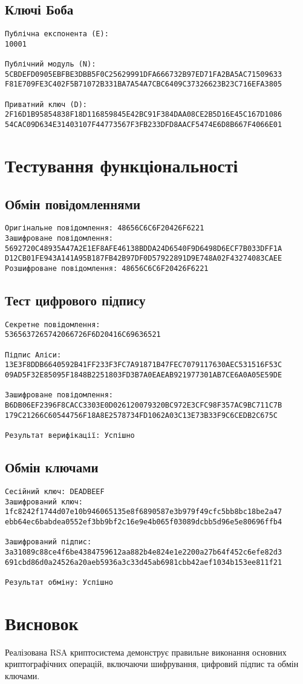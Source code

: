 \documentclass[12pt]{article}
\begin{document}
\subsection{Ключі Боба}
\begin{verbatim}
Публічна експонента (E):
10001

Публічний модуль (N):
5CBDEFD0905EBFBE3DBB5F0C25629991DFA666732B97ED71FA2BA5AC71509633
F81E709FE3C402F5B71072B331BA7A54A7CBC6409C37326623B23C716EFA3805

Приватний ключ (D):
2F16D1B95854838F18D116859845E42BC91F384DAA08CE2B5D16E45C167D1086
54CAC09D634E31403107F44773567F3FB233DFD8AACF5474E6D8B667F4066E01
\end{verbatim}

\section{Тестування функціональності}

\subsection{Обмін повідомленнями}
\begin{verbatim}
Оригінальне повідомлення: 48656C6C6F20426F6221
Зашифроване повідомлення: 
5692720C48935A47A2E1EF8AFE46138BDDA24D6540F9D6498D6ECF7B033DFF1A
D12CB01FE943A141A95B187FB42B97DF0D57922891D9E748A02F43274083CAEE
Розшифроване повідомлення: 48656C6C6F20426F6221
\end{verbatim}

\subsection{Тест цифрового підпису}
\begin{verbatim}
Секретне повідомлення: 
5365637265742066726F6D20416C69636521

Підпис Аліси:
13E3F8DDB6640592B41FF233F3FC7A91871B47FEC7079117630AEC531516F53C
09AD5F32E85095F1848B2251803FD3B7A0EAEAB921977301AB7CE6A0A05E59DE

Зашифроване повідомлення:
B6DB06EF2396F8CACC3303E0D026120079320BC972E3CFC98F357AC9BC711C7B
179C21266C60544756F18A8E2578734FD1062A03C13E73B33F9C6CEDB2C675C

Результат верифікації: Успішно
\end{verbatim}

\subsection{Обмін ключами}
\begin{verbatim}
Сесійний ключ: DEADBEEF
Зашифрований ключ:
1fc8242f1744d07e10b946065135e8f6890587e3b979f49cfc5bb8bc18be2a47
ebb64ec6babdea0552ef3bb9bf2c16e9e4b065f03089dcbb5d96e5e80696ffb4

Зашифрований підпис:
3a31089c88ce4f6be4384759612aa882b4e824e1e2200a27b64f452c6efe82d3
691cbd86d0a24526a20aeb5936a3c33d45ab6981cbb42aef1034b153ee811f21

Результат обміну: Успішно
\end{verbatim}

\section{Висновок}
Реалізована RSA криптосистема демонструє правильне  виконання основних криптографічних операцій, включаючи шифрування, цифровий підпис та обмін ключами.
\end{document}
